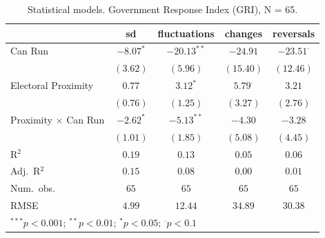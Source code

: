
\begin{table}
\begin{center}
\begin{tabular}{l c c c c}
\hline
 & sd & fluctuations & changes & reversals \\
\hline
Can Run                    & $-8.07^{*}$ & $-20.13^{**}$ & $-24.91$       & $-23.51^{\cdot}$ \\
                           & $(3.62)$    & $(5.96)$      & $(15.40)$      & $(12.46)$        \\
Electoral Proximity        & $0.77$      & $3.12^{*}$    & $5.79^{\cdot}$ & $3.21$           \\
                           & $(0.76)$    & $(1.25)$      & $(3.27)$       & $(2.76)$         \\
Proximity $\times$ Can Run & $-2.62^{*}$ & $-5.13^{**}$  & $-4.30$        & $-3.28$          \\
                           & $(1.01)$    & $(1.85)$      & $(5.08)$       & $(4.45)$         \\
\hline
R$^2$                      & $0.19$      & $0.13$        & $0.05$         & $0.06$           \\
Adj.\ R$^2$                & $0.15$      & $0.08$        & $0.00$         & $0.01$           \\
Num.\ obs.                 & $65$        & $65$          & $65$           & $65$             \\
RMSE                       & $4.99$      & $12.44$       & $34.89$        & $30.38$          \\
\hline
\multicolumn{5}{l}{\scriptsize{$^{***}p<0.001$; $^{**}p<0.01$; $^{*}p<0.05$; $^{\cdot}p<0.1$}}
\end{tabular}
\caption{Statistical models. Government Response Index (GRI), N = 65.}
\label{table:coefficients:policy}
\end{center}
\end{table}


